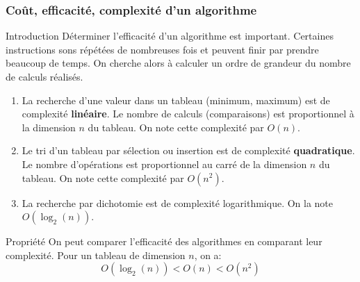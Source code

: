 \documentclass[9pt]{beamer}
\newcounter{num}
\begin{document}
\begin{frame}
\frametitle{Coût, efficacité, complexité d'un algorithme}

\begin{block}{Introduction}
Déterminer l'efficacité d'un algorithme est important. Certaines instructions sons répétées de nombreuses fois et peuvent finir par prendre beaucoup de temps. On cherche alors à calculer un ordre de grandeur du nombre de calculs réalisés.
\begin{enumerate}
\item La recherche d'une valeur dans un tableau (minimum, maximum) est de complexité \textbf{linéaire}. Le nombre de calculs (comparaisons) est proportionnel à la dimension $n$ du tableau. On note cette complexité par $O(n)$.
\item Le tri d'un tableau par sélection ou insertion est de complexité \textbf{quadratique}. Le nombre d'opérations est proportionnel au carré de la dimension $n$ du tableau. On note cette complexité par $O(n^2)$.
\item La recherche par dichotomie est de complexité logarithmique. On la note $O(\log_{2}(n))$.
\end{enumerate}
\end{block}

\begin{block}{Propriété}
On peut comparer l'efficacité des algorithmes en comparant leur complexité. Pour un tableau de dimension $n$, on a: 
\[O(\log_{2}(n)) < O(n) < O(n^2)\]
\end{block}

\end{frame}
\end{document}
